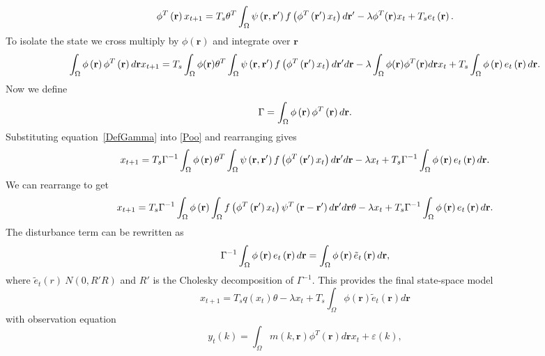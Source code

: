 \documentclass[onecolumn,draftcls]{IEEEtran}
\begin{document}
\begin{equation}\label{reduced continuous model}
\phi ^T\left( \mathbf{r} \right)x_{t+1} = T_s\theta^T\int_\Omega  {\psi \left( {{\bf{r}} , {\mathbf{r'}}} \right)f\left( {{\phi ^T}\left( {{\mathbf{r'}}} \right){x_t}} \right)d{\mathbf{r'}}}  - \lambda\phi^T(\mathbf{r})x_t + T_s{e_t}\left( {\mathbf{r}} \right).
\end{equation}
To isolate the state we cross multiply by $\phi(\mathbf{r})$ and integrate over $\mathbf{r}$
\begin{equation}\label{Poo}
\int_\Omega  {\phi \left( {\bf{r}} \right){\phi ^T}\left( {\bf{r}} \right)d{\bf{r}}{x_{t+1}}}  = T_s\int_\Omega  {\phi ( \mathbf{r} )\theta^T\int_\Omega  {\psi \left( {{\bf{r}} , {\bf{r'}}} \right)f\left( {{\phi ^T}\left( {{\bf{r'}}} \right){x_t}} \right)d{\bf{r'}}} d{\bf{r}}}  - \lambda\int_\Omega \phi(\mathbf{r})\phi^T(\mathbf{r})d\mathbf{r} x_t  + T_s\int_\Omega  {\phi \left( {\mathbf{r}} \right)e_t\left( {\mathbf{r}} \right)d{\mathbf{r}}}.
\end{equation}
Now we define
\begin{equation}\label{DefGamma}
\Gamma  = \int_\Omega  {\phi \left( {\bf{r}} \right){\phi ^T}\left( {\bf{r}} \right)d{\bf{r}}}.
\end{equation}
Substituting equation~\ref{DefGamma} into \ref{Poo} and rearranging gives
\begin{equation}\label{SS Model}
{x_{t+1}} = T_s{\Gamma ^{ - 1}}\int_\Omega  {\phi \left( {\bf{r}} \right)\theta^T\int_\Omega  {\psi \left( {{\bf{r}} , {\bf{r'}}} \right)f\left( {{\phi ^T}\left( {{\bf{r'}}} \right){x_t}} \right)d{\bf{r'}}} d{\bf{r}}} - \lambda x_t + T_s{\Gamma ^{ - 1}}\int_\Omega  {\phi \left( {\bf{r}} \right)e_t\left( {\bf{r}} \right)d{\bf{r}}}.
\end{equation}
We can rearrange to get
\begin{equation}\label{Homogeneous SS Model}
	x_{t+1} = T_s\Gamma ^{ - 1}\int_\Omega  {\phi \left( {\bf{r}} \right)\int_\Omega  {f\left( {{\phi ^T}\left( {{\bf{r'}}} \right){x_t}} \right)\psi^T \left( {{\bf{r}} - {\bf{r'}}} \right)d{\bf{r'}}} d{\bf{r}}}\theta - \lambda x_t + T_s{\Gamma ^{ - 1}}\int_\Omega  {\phi \left( {\bf{r}} \right)e_t\left( {\bf{r}} \right)d{\bf{r}}}.
\end{equation}
The disturbance term can be rewritten as 
\begin{equation}
	\Gamma ^{ - 1}\int_\Omega  {\phi \left( \bf{r} \right)e_t\left( \bf{r} \right)d\bf{r}} = \int_\Omega  {\phi \left( \bf{r} \right)\tilde{e}_t\left( \bf{r} \right)d\bf{r}},
\end{equation}
where $\tilde{e}_t(r)~N(0,R'R)$ and $R'$ is the Cholesky decomposition of $\Gamma^{-1}$. This provides the final state-space model
\begin{equation}\label{AbbrevSSModel}
x_{t + 1} = T_sq(x_t)\theta -\lambda x_t + T_s\int_\Omega  {\phi ( \mathbf{r} )\tilde{e}_t( \mathbf{r} )d\mathbf{r}}
\end{equation}
with observation equation
\begin{equation}\label{ObservationEquation}
    y_t( k ) = \int_\Omega  m( k,\mathbf{r} )\phi^T( \mathbf{r} ) d\mathbf{r}x_t  + \varepsilon ( k ),
\end{equation}
\end{document}
